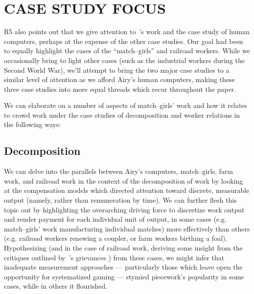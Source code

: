 \documentclass[11pt]{article}
\begin{document}

\section*{CASE STUDY FOCUS}
R5 also points out that we give attention to~\citeauthor{grier2013computers}'s work and
the case study of human computers,
perhaps at the expense of the other case studies.
Our goal had been to equally highlight the cases of the ``match--girls'' and railroad workers.
While we occasionally bring to light other cases
(such as the industrial workers during the Second World War),
we'll attempt to bring the two major case studies to
a similar level of attention as we afford Airy's human computers,
making these three case studies into
more equal threads which recur throughout the paper.

We can elaborate on a number of aspects of match--girls' work and
how it relates to crowd work under the case studies of
decomposition and worker relations in the following ways:


\subsection*{Decomposition}
We can delve into the parallels between
Airy's computers, match--girls, farm work, and railroad work in the context of
the decomposition of work by looking at
the compensation models which directed attention toward
discrete, measurable output (namely, rather than remuneration by time).
We can further flesh this topic out by highlighting
the overarching driving force to discretize work output and
render payment for each individual unit of output,
in some cases (e.g. match--girls' work manufacturing individual matches)
more effectively than others (e.g. railroad workers renewing a coupler, or
                                   farm workers birthing a foal).
Hypothesizing
(and in the case of railroad work, deriving some insight from
the critiques outlined by~\citeauthor{american1921problem}'s grievances \cite{american1921problem})
from these cases, we might infer that inadequate measurement approaches
--- particularly those which leave open the opportunity for systematized gaming ---
stymied piecework's popularity in some cases, while in others it flourished.
\end{document}
